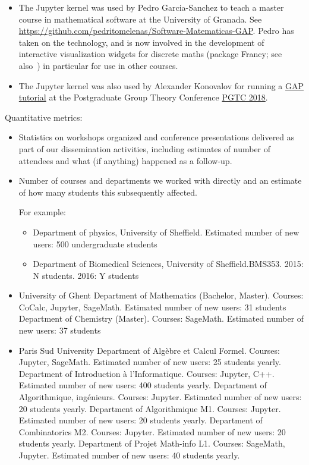 \begin{Aim 1}
\begin{Aim 2}
\begin{itemize}
     \item The \GAP Jupyter kernel was used by Pedro Garcia-Sanchez to teach a master course in mathematical software at the University of
     Granada. See  \url{https://github.com/pedritomelenas/Software-Matematicas-GAP}. Pedro has taken on the technology, and is now involved
     in the   development of interactive visualization widgets for discrete maths (package Francy; see also~) in particular for use in other courses.
     
     \item The \GAP Jupyter kernel was also used by Alexander Konovalov for running a \href{https://github.com/alex-konovalov/gap-teaching
     /}{GAP tutorial} at the Postgraduate Group Theory Conference \href{http://www-groups.mcs.st-and.ac.uk/~pgtc2018/}{PGTC 2018}.
     \end{itemize}



Quantitative metrics:
\begin{itemize}
\item Statistics on workshops organized and conference presentations delivered as part of our dissemination activities, including estimates of number of attendees and what (if anything) happened as a follow-up.
\item Number of courses and departments we worked with directly and an estimate of how many students this subsequently affected.

  For example:
  \begin{itemize}
  \item Department of physics, University of Sheffield. Estimated number of new users: 500 undergraduate students
  \item Department of Biomedical Sciences, University of Sheffield.BMS353. 2015: N students. 2016: Y students
  \end{itemize}
\end{itemize}

\begin{itemize}
  \item University of Ghent
  Department of Mathematics (Bachelor, Master). Courses: CoCalc, Jupyter, SageMath. Estimated number of new users: 31 students
  Department of Chemistry (Master). Courses: SageMath. Estimated number of new users: 37 students
  
  \item Paris Sud University 
  Department of Algèbre et Calcul Formel. Courses: Jupyter, SageMath. Estimated number of new users: 25 students yearly.
  Department of Introduction à l'Informatique. Courses: Jupyter, C++. Estimated number of new users: 400 students yearly.
  Department of Algorithmique, ingénieurs. Courses: Jupyter. Estimated number of new users: 20 students yearly.
  Department of Algorithmique M1. Courses: Jupyter. Estimated number of new users: 20 students yearly.
  Department of Combinatorics M2. Courses: Jupyter. Estimated number of new users: 20 students yearly.
  Department of Projet Math-info L1. Courses: SageMath, Jupyter. Estimated number of new users: 40 students yearly.
  

\end{itemize}
\end{Aim 2}
\end{Aim 1}

